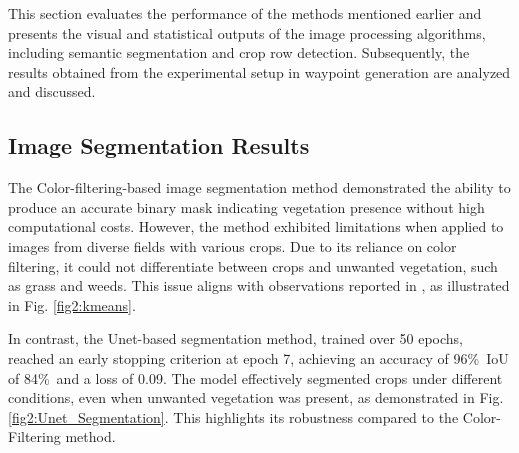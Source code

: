 \documentclass[conference]{IEEEtran}
\begin{document}
	This section evaluates the performance of the methods mentioned earlier and presents the visual and statistical outputs of the image processing algorithms, including semantic segmentation and crop row detection. Subsequently, the results obtained from the experimental setup in waypoint generation are analyzed and discussed.
	\subsection{Image Segmentation Results}
	
	The Color-filtering-based image segmentation method demonstrated the ability to produce an accurate binary mask indicating vegetation presence without high computational costs. However, the method exhibited limitations when applied to images from diverse fields with various crops. Due to its reliance on color filtering, it could not differentiate between crops and unwanted vegetation, such as grass and weeds. This issue aligns with observations reported in \cite{b5}, as illustrated in Fig.
	\ref{fig2:kmeans}.
	
	
	In contrast, the Unet-based segmentation method, trained over 50 epochs, reached an early stopping criterion at epoch 7, achieving an accuracy of 96\%\, IoU of 84\%\ and a loss of 0.09. The model effectively segmented crops under different conditions, even when unwanted vegetation was present, as demonstrated in Fig.
	\ref{fig2:Unet_Segmentation}.
	This highlights its robustness compared to the Color-Filtering method.
	
\end{document}
